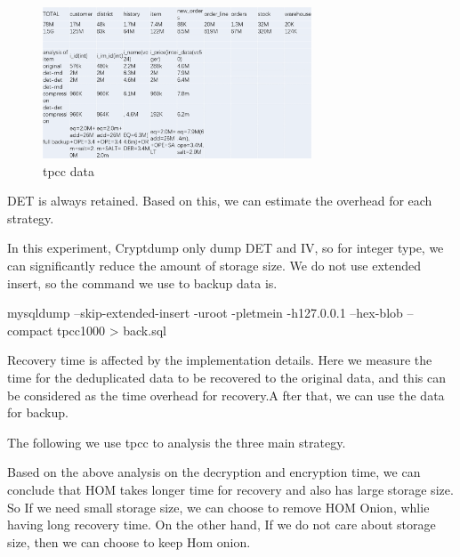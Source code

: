 \begin{figure}[tb]
\centering
\includegraphics[width=8cm]{images/tpcc.png}
\caption{tpcc data}
\label{fig:stack13}
\end{figure}


DET is always retained. Based on this, we can estimate the overhead for each strategy. 



In this experiment, Cryptdump only dump DET and IV, so for integer type, we can significantly reduce the amount of storage size. We do not use extended insert, so the command we use to backup data is.


mysqldump --skip-extended-insert -uroot -pletmein -h127.0.0.1 --hex-blob --compact tpcc1000 > back.sql



Recovery time is affected by the implementation details. Here we measure the time for the deduplicated data to be recovered to the original data, and this can be considered as the time overhead for recovery.A fter that, we can use the data for backup.


The following we use tpcc to analysis the three main strategy.


Based on the above analysis on the decryption and encryption time, we can conclude that HOM takes longer time for recovery and also has large storage size. So If we need small storage size, we can choose to remove HOM Onion, whlie having long recovery time. On the other hand, If we do not care about storage size, then we can choose to keep Hom onion. 

